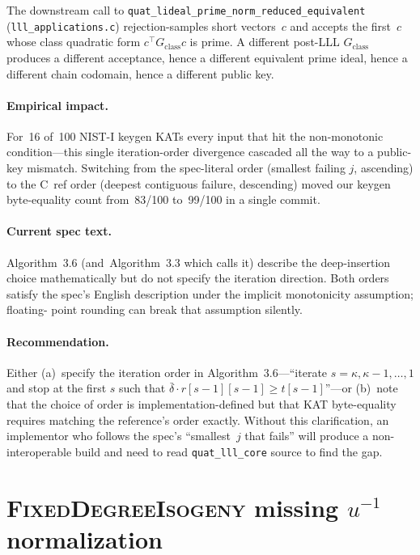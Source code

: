 \documentclass[a4paper,11pt]{article}
\newcommand{\algo}[1]{Algorithm~#1}
\begin{document}
The downstream call to
\texttt{quat\_lideal\_prime\_norm\_reduced\_equivalent}
(\texttt{lll\_applications.c}) rejection-samples short vectors~$c$
and accepts the first~$c$ whose class quadratic form
$c^\top G_{\mathrm{class}} c$ is prime.  A different post-LLL
$G_{\mathrm{class}}$ produces a different acceptance, hence a
different equivalent prime ideal, hence a different chain codomain,
hence a different public key.

\paragraph{Empirical impact.}
For~16 of~100 NIST-I keygen KATs every input that hit the
non-monotonic condition---this single iteration-order divergence
cascaded all the way to a public-key mismatch.  Switching from the
spec-literal order (smallest failing $j$, ascending) to the C~ref
order (deepest contiguous failure, descending) moved our keygen
byte-equality count from~83/100 to~99/100 in a single commit.

\paragraph{Current spec text.}
\algo{3.6} (and~\algo{3.3} which calls it) describe the
deep-insertion choice mathematically but do not specify the
iteration direction.  Both orders satisfy the spec's English
description under the implicit monotonicity assumption; floating-
point rounding can break that assumption silently.

\paragraph{Recommendation.}
Either (a)~specify the iteration order in \algo{3.6}---``iterate
$s = \kappa, \kappa-1, \ldots, 1$ and stop at the first $s$ such
that $\bar\delta \cdot r[s-1][s-1] \ge t[s-1]$''---or (b)~note that
the choice of order is implementation-defined but that KAT
byte-equality requires matching the reference's order exactly.
Without this clarification, an implementor who follows the spec's
``smallest~$j$ that fails'' will produce a non-interoperable build
and need to read \texttt{quat\_lll\_core} source to find the gap.

\section{\textsc{FixedDegreeIsogeny} missing $u^{-1}$ normalization}
\label{sec:u-inv}
\end{document}
